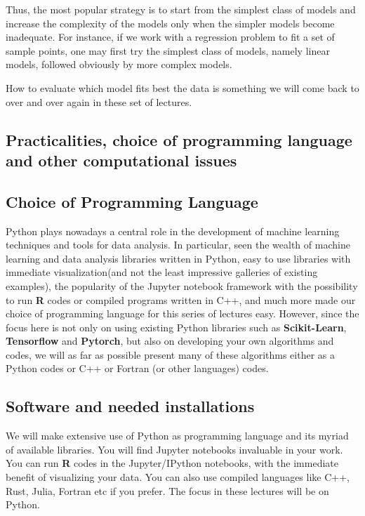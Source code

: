\documentclass[%
oneside,                 %
final,                   %
10pt]{article}
\begin{document}
Thus, the most popular strategy is to start from the
simplest class of models and increase the complexity of the models only when the
simpler models become inadequate. For instance, if we work with a regression problem to fit a set of sample points, one
may first try the simplest class of models, namely linear models, followed obviously by more complex models.

How to evaluate which model fits best the data is something we will come back to over and over again in these set of lectures.

\subsection*{Practicalities, choice of programming language and other computational issues}

\subsection*{Choice of Programming Language}

Python plays nowadays a central role in the development of machine
learning techniques and tools for data analysis. In particular, seen
the wealth of machine learning and data analysis libraries written in
Python, easy to use libraries with immediate visualization(and not the
least impressive galleries of existing examples), the popularity of the
Jupyter notebook framework with the possibility to run \textbf{R} codes or
compiled programs written in C++, and much more made our choice of
programming language for this series of lectures easy. However,
since the focus here is not only on using existing Python libraries such
as \textbf{Scikit-Learn}, \textbf{Tensorflow} and \textbf{Pytorch}, but also on developing your own
algorithms and codes, we will as far as possible present many of these
algorithms either as a Python codes or C++ or Fortran (or other languages) codes. 






\subsection*{Software and needed installations}

We will make extensive use of Python as programming language and its
myriad of available libraries.  You will find
Jupyter notebooks invaluable in your work.  You can run \textbf{R}
codes in the Jupyter/IPython notebooks, with the immediate benefit of
visualizing your data. You can also use compiled languages like C++,
Rust, Julia, Fortran etc if you prefer. The focus in these lectures will be
on Python.
\end{document}

